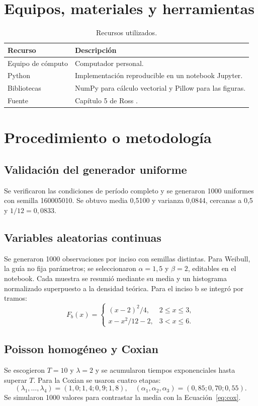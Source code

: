 \documentclass[11pt,a4paper]{article}
\begin{document}
\section{Equipos, materiales y herramientas}
\begin{table}[H]\centering
\caption{Recursos utilizados.}
\begin{tabular}{p{}p{}}\toprule
\textbf{Recurso}&\textbf{Descripción}\\\midrule
Equipo de cómputo&Computador personal.\\
Python&Implementación reproducible en un notebook Jupyter.\\
Bibliotecas&NumPy para cálculo vectorial y Pillow para las figuras.\\
Fuente&Capítulo 5 de Ross \cite{ross2013}.\\\bottomrule
\end{tabular}\end{table}

\section{Procedimiento o metodología}
\subsection{Validación del generador uniforme}
Se verificaron las condiciones de período completo y se generaron 1000 uniformes con
semilla 160005010. Se obtuvo media 0,5100 y varianza 0,0844, cercanas a 0,5 y
$1/12=0,0833$.

\subsection{Variables aleatorias continuas}
Se generaron 1000 observaciones por inciso con semillas distintas. Para Weibull, la guía
no fija parámetros; se seleccionaron $\alpha=1,5$ y $\beta=2$, editables en el notebook.
Cada muestra se resumió mediante su media y un histograma normalizado superpuesto a la
densidad teórica. Para el inciso b se integró por tramos:
\begin{equation}F_b(x)=\begin{cases}(x-2)^2/4,&2\leq x\leq3,\\x-x^2/12-2,&3<x\leq6.\end{cases}\end{equation}

\subsection{Poisson homogéneo y Coxian}
Se escogieron $T=10$ y $\lambda=2$ y se acumularon tiempos exponenciales hasta superar
$T$. Para la Coxian se usaron cuatro etapas:
\begin{equation}(\lambda_1,\ldots,\lambda_4)=(1,0;1,4;0,9;1,8),\quad
(\alpha_1,\alpha_2,\alpha_3)=(0,85;0,70;0,55).\end{equation}
Se simularon 1000 valores para contrastar la media con la Ecuación~\eqref{eq:cox}.
\end{document}
